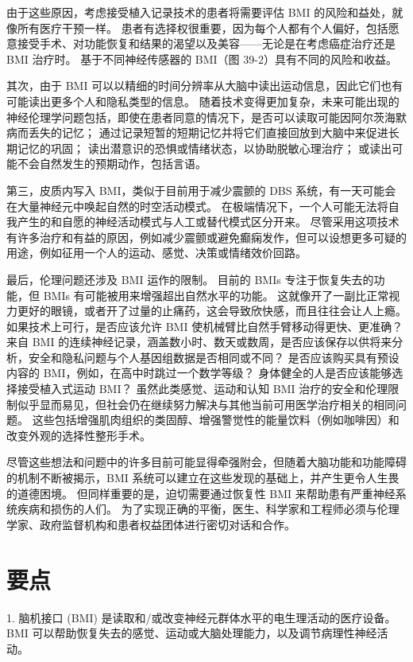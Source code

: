 由于这些原因，考虑接受植入记录技术的患者将需要评估 BMI 的风险和益处，就像所有医疗干预一样。 患者有选择权很重要，因为每个人都有个人偏好，包括愿意接受手术、对功能恢复和结果的渴望以及美容——无论是在考虑癌症治疗还是 BMI 治疗时。 基于不同神经传感器的 BMI（图 39-2）具有不同的风险和收益。

其次，由于 BMI 可以以精细的时间分辨率从大脑中读出运动信息，因此它们也有可能读出更多个人和隐私类型的信息。 随着技术变得更加复杂，未来可能出现的神经伦理学问题包括，即使在患者同意的情况下，是否可以读取可能因阿尔茨海默病而丢失的记忆； 通过记录短暂的短期记忆并将它们直接回放到大脑中来促进长期记忆的巩固； 读出潜意识的恐惧或情绪状态，以协助脱敏心理治疗； 或读出可能不会自然发生的预期动作，包括言语。

第三，皮质内写入 BMI，类似于目前用于减少震颤的 DBS 系统，有一天可能会在大量神经元中唤起自然的时空活动模式。 在极端情况下，一个人可能无法将自我产生的和自愿的神经活动模式与人工或替代模式区分开来。 尽管采用这项技术有许多治疗和有益的原因，例如减少震颤或避免癫痫发作，但可以设想更多可疑的用途，例如征用一个人的运动、感觉、决策或情绪效价回路。

最后，伦理问题还涉及 BMI 运作的限制。 目前的 BMIs 专注于恢复失去的功能，但 BMIs 有可能被用来增强超出自然水平的功能。 这就像开了一副比正常视力更好的眼镜，或者开了过量的止痛药，这会导致欣快感，而且往往会让人上瘾。 如果技术上可行，是否应该允许 BMI 使机械臂比自然手臂移动得更快、更准确？ 来自 BMI 的连续神经记录，涵盖数小时、数天或数周，是否应该保存以供将来分析，安全和隐私问题与个人基因组数据是否相同或不同？ 是否应该购买具有预设内容的 BMI，例如，在高中时跳过一个数学等级？ 身体健全的人是否应该能够选择接受植入式运动 BMI？ 虽然此类感觉、运动和认知 BMI 治疗的安全和伦理限制似乎显而易见，但社会仍在继续努力解决与其他当前可用医学治疗相关的相同问题。 这些包括增强肌肉组织的类固醇、增强警觉性的能量饮料（例如咖啡因）和改变外观的选择性整形手术。

尽管这些想法和问题中的许多目前可能显得牵强附会，但随着大脑功能和功能障碍的机制不断被揭示，BMI 系统可以建立在这些发现的基础上，并产生更令人生畏的道德困境。 但同样重要的是，迫切需要通过恢复性 BMI 来帮助患有严重神经系统疾病和损伤的人们。 为了实现正确的平衡，医生、科学家和工程师必须与伦理学家、政府监督机构和患者权益团体进行密切对话和合作。

\section{要点}

1. 脑机接口 (BMI) 是读取和/或改变神经元群体水平的电生理活动的医疗设备。 BMI 可以帮助恢复失去的感觉、运动或大脑处理能力，以及调节病理性神经活动。 

